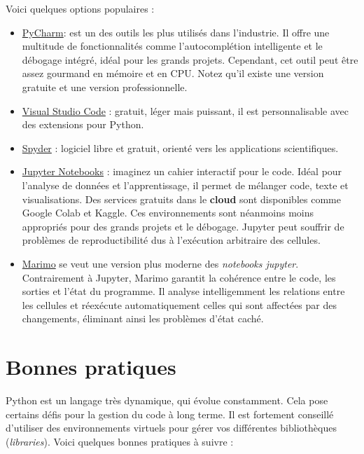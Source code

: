 \documentclass[
  11pt,
  letterpaper,
  open=any,
  twoside=false,
  french]{scrbook}
\begin{document}
Voici quelques options populaires :

\begin{itemize}
\item
  \href{https://www.jetbrains.com/pycharm/}{PyCharm}: est un des outils
  les plus utilisés dans l'industrie. Il offre une multitude de
  fonctionnalités comme l'autocomplétion intelligente et le débogage
  intégré, idéal pour les grands projets. Cependant, cet outil peut être
  assez gourmand en mémoire et en CPU. Notez qu'il existe une version
  gratuite et une version professionnelle.
\item
  \href{https://code.visualstudio.com/}{Visual Studio Code} : gratuit,
  léger mais puissant, il est personnalisable avec des extensions pour
  Python.
\item
  \href{https://www.spyder-ide.org/}{Spyder} : logiciel libre et
  gratuit, orienté vers les applications scientifiques.
\item
  \href{https://jupyter.org/}{Jupyter Notebooks} : imaginez un cahier
  interactif pour le code. Idéal pour l'analyse de données et
  l'apprentissage, il permet de mélanger code, texte et visualisations.
  Des services gratuits dans le \textbf{cloud} sont disponibles comme
  Google Colab et Kaggle. Ces environnements sont néanmoins moins
  appropriés pour des grands projets et le débogage. Jupyter peut
  souffrir de problèmes de reproductibilité dus à l'exécution arbitraire
  des cellules.
\item
  \href{https://marimo.io/}{Marimo} se veut une version plus moderne des
  \emph{notebooks jupyter}. Contrairement à Jupyter, Marimo garantit la
  cohérence entre le code, les sorties et l'état du programme. Il
  analyse intelligemment les relations entre les cellules et réexécute
  automatiquement celles qui sont affectées par des changements,
  éliminant ainsi les problèmes d'état caché.
\end{itemize}

\section{Bonnes pratiques}\label{bonnes-pratiques}

Python est un langage très dynamique, qui évolue constamment. Cela pose
certains défis pour la gestion du code à long terme. Il est fortement
conseillé d'utiliser des environnements virtuels pour gérer vos
différentes bibliothèques (\emph{libraries}). Voici quelques bonnes
pratiques à suivre :
\end{document}
